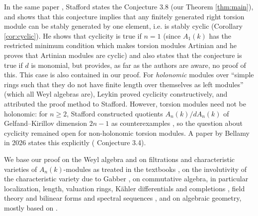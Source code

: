 \documentclass[pdflatex,sn-mathphys-num]{sn-jnl}
\numberwithin{equation}{section}
\theoremstyle{thmstyleone}
\theoremstyle{thmstyletwo}
\begin{document}
In the same paper \cite{Stafford1978}, Stafford states the Conjecture 3.8 (our Theorem \ref{thm:main}), and shows that this conjecture implies that any finitely generated right torsion module can be stably generated by one element, i.e. is stably cyclic (Corollary \ref{cor:cyclic}). He shows that cyclicity is true if $n = 1$ (since $A_1(k)$ has the restricted minimum condition which makes torsion modules Artinian and he proves that Artinian modules are cyclic) and also states that the conjecture is true if $d$ is monomial, but provides, as far as the authors are aware, no proof of this. This case is also contained in our proof.
For \textit{holonomic} modules over ``simple rings such that they do not have finite length over themselves as left modules'' (which all Weyl algebras are), Leykin \cite{Leykin2004} proved cyclicity constructively, and attributed the proof method to Stafford. However, torsion modules need not be holonomic: for $n\ge2$, Stafford constructed quotients $A_n(k)/dA_n(k)$ of Gelfand--Kirillov dimension $2n-1$ as counterexamples  \cite{StaffordNonholonomic1985}, so the question about cyclicity remained open for non-holonomic torsion modules. A paper by Bellamy in 2026 states this explicitly (\cite{Bellamy2026} Conjecture 3.4). 

We base our proof on the Weyl algebra and on filtrations and characteristic
varieties of $A_n(k)$-modules as treated in the textbooks
\cite{coutinho,Bjork,HTT,MR,SchnellNotes}, on the involutivity of
the characteristic variety due to Gabber \cite{Gabber1981,Gabber1982,SinghKumar2014}, on commutative algebra, in particular localization, length, valuation rings, Kähler differentials and completions
\cite{atiyah,matsumura,Stacks}, field theory and bilinear forms \cite{lang} and spectral sequences \cite{weibel}, and on
algebraic geometry, mostly based on \cite{hartshorne}.
\end{document}
